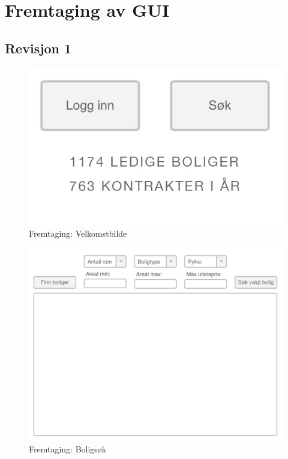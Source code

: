 \chapter{Fremtaging av GUI}

\section{Revisjon 1}

\begin{figure}[ht]
 \includegraphics[width=\textwidth,height=\textheight,keepaspectratio]{./img/appendix/gui_forslag/rev_1/Velkomstbilde.jpg}
 \caption{Fremtaging: Velkomstbilde}
 \label{fig:DEV:velkomstbilde}
\end{figure}

\begin{figure}[ht]
 \includegraphics[width=\textwidth,height=\textheight,keepaspectratio]{./img/appendix/gui_forslag/rev_1/Boligsok.png}
 \caption{Fremtaging: Boligsøk}
 \label{fig:DEV:boligsok}
\end{figure}

